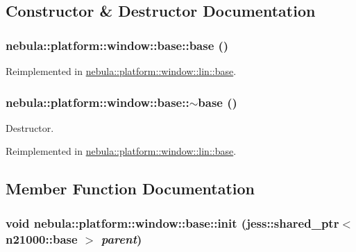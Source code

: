 \subsection{Constructor \& Destructor Documentation}
\hypertarget{classnebula_1_1platform_1_1window_1_1base_afcbf9d5d846a10cce5ebf100e1abbca1}{
\subsubsection[{base}]{\setlength{\rightskip}{0pt plus 5cm}nebula::platform::window::base::base ()}}
\label{classnebula_1_1platform_1_1window_1_1base_afcbf9d5d846a10cce5ebf100e1abbca1}


Reimplemented in \hyperlink{classnebula_1_1platform_1_1window_1_1lin_1_1base_a9441236d249988aee2ae24c70acc2d25}{nebula::platform::window::lin::base}.\hypertarget{classnebula_1_1platform_1_1window_1_1base_a40f1250dd3383ad57200c65e969d3e5b}{
\subsubsection[{$\sim$base}]{\setlength{\rightskip}{0pt plus 5cm}nebula::platform::window::base::$\sim$base ()}}
\label{classnebula_1_1platform_1_1window_1_1base_a40f1250dd3383ad57200c65e969d3e5b}


Destructor. 

Reimplemented in \hyperlink{classnebula_1_1platform_1_1window_1_1lin_1_1base_aee19a7238b38b14e69a87d7e9c95aa13}{nebula::platform::window::lin::base}.

\subsection{Member Function Documentation}
\hypertarget{classnebula_1_1platform_1_1window_1_1base_abd4bc47dc2a14a21885cc6df06c8ec43}{
\subsubsection[{init}]{\setlength{\rightskip}{0pt plus 5cm}void nebula::platform::window::base::init (jess::shared\_\-ptr$<$ {\bf n21000::base} $>$ {\em parent})}}
\label{classnebula_1_1platform_1_1window_1_1base_abd4bc47dc2a14a21885cc6df06c8ec43}


